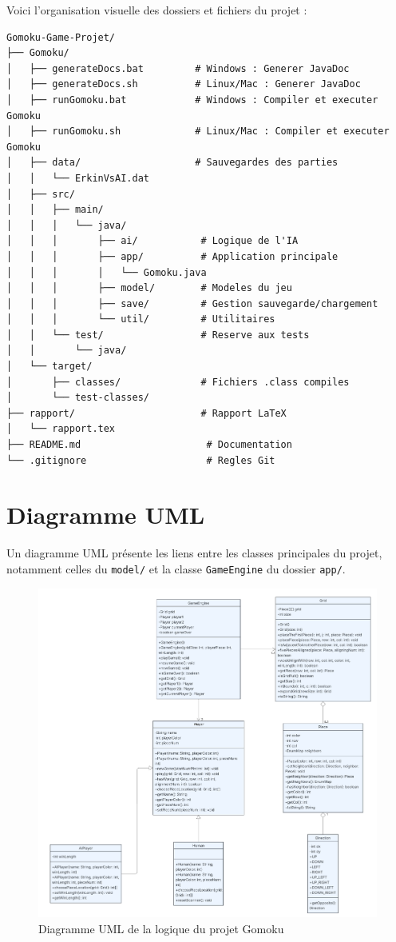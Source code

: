 \documentclass[a4paper,11pt]{article}
\begin{document}
Voici l'organisation visuelle des dossiers et fichiers du projet :

\begin{lstlisting}[style=tree]
Gomoku-Game-Projet/
├── Gomoku/
│   ├── generateDocs.bat         # Windows : Generer JavaDoc
│   ├── generateDocs.sh          # Linux/Mac : Generer JavaDoc
│   ├── runGomoku.bat            # Windows : Compiler et executer Gomoku
│   ├── runGomoku.sh             # Linux/Mac : Compiler et executer Gomoku
│   ├── data/                    # Sauvegardes des parties
│   │   └── ErkinVsAI.dat
│   ├── src/
│   │   ├── main/
│   │   │   └── java/
│   │   │       ├── ai/           # Logique de l'IA
│   │   │       ├── app/          # Application principale
│   │   │       │   └── Gomoku.java
│   │   │       ├── model/        # Modeles du jeu
│   │   │       ├── save/         # Gestion sauvegarde/chargement
│   │   │       └── util/         # Utilitaires
│   │   └── test/                 # Reserve aux tests
│   │       └── java/
│   └── target/
│       ├── classes/              # Fichiers .class compiles
│       └── test-classes/
├── rapport/                      # Rapport LaTeX
│   └── rapport.tex
├── README.md                      # Documentation
└── .gitignore                     # Regles Git
\end{lstlisting}

\newpage

\section{Diagramme UML}


Un diagramme UML pr\'esente les liens entre les classes principales du projet, notamment celles du \texttt{model/} et la classe \texttt{GameEngine} du dossier \texttt{app/}.


\begin{figure}[h!]
    \centering
    \includegraphics[width=1\textwidth]{img/gomoku-UML.png}
    \caption{Diagramme UML de la logique du projet Gomoku}
    \label{fig:uml}
\end{figure}
\end{document}
